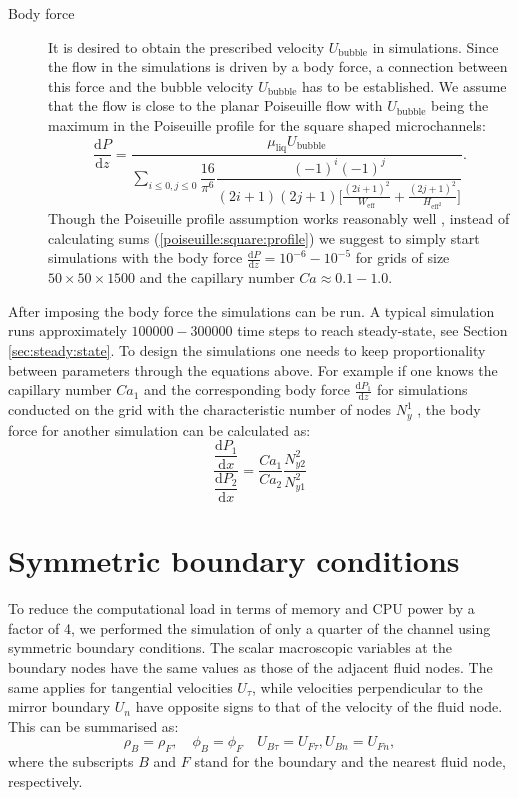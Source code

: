 \documentclass{article}
\begin{document}
\begin{description}
\item[Body force] 
It is desired to obtain the prescribed velocity $U_{\mathrm{bubble}}$ in simulations. Since the
flow in the simulations is driven by a body force, a connection between this force and the
bubble velocity $U_{\mathrm{bubble}}$ has to be established. We assume that the
flow is close to the planar Poiseuille flow with $U_{\mathrm{bubble}}$ being the maximum in the
Poiseuille profile for the square shaped microchannels:
\begin{equation}
\label{poiseuille:square:profile}
\dfrac{\mathrm{d}P}{\mathrm{d}z}=\frac{\mu_{\mathrm{liq}} U_{\mathrm{bubble}}}{\sum_{i\leq 0,j\leq
0}{\dfrac{16}{\pi^6} \dfrac{(-1)^i (-1)^j}{(2 i+1)(2 j+1)\bigl[\frac{(2 i
+1)^2}{W_{\mathrm{eff}}}+\frac{(2 j+1)^2}{H_{\mathrm{eff}^2}}\bigr]}}}.
\end{equation}
Though the Poiseuille profile assumption works reasonably well \cite{kuzmin-binary2d}, instead of
calculating sums (\ref{poiseuille:square:profile}) we suggest to simply start simulations with the
body force $\frac{\mathrm{d}P}{\mathrm{d}z}=10^{-6}-10^{-5}$ for grids of size $50\times 50 \times
1500$ and the capillary number $Ca\approx0.1-1.0$.  
\end{description}
After imposing the body force the simulations can be run. A typical simulation runs approximately
$100000-300000$ time steps to reach steady-state, see Section \ref{sec:steady:state}. To design the
simulations one needs to keep proportionality between parameters through the equations above. For
example if one knows the capillary number $Ca_1$ and the corresponding body force
$\frac{\mathrm{d}P_1}{\mathrm{d}z}$ for simulations conducted on the grid with the characteristic
number of nodes $N_y^1$ , the body force for another simulation can be calculated as:
\begin{equation}
\dfrac{\dfrac{\mathrm{d}P_1}{\mathrm{d}x}}{\dfrac{\mathrm{d}P_2}{\mathrm{d}x}}=\frac{Ca_1}{Ca_2}
\frac{N_{
y2}^2 }{N_{y1}^2}
\end{equation}

\section{Symmetric boundary conditions}
\label{append:sym}
To reduce the computational load in terms of memory and CPU power by a factor of 4, we performed the simulation of 
only a quarter of the channel using symmetric boundary conditions.  The scalar macroscopic variables
at the boundary nodes have the same values as those of the adjacent fluid nodes.  The same applies
for tangential velocities $U_{\tau}$, while velocities perpendicular  to the mirror boundary $U_n$ have opposite signs
to that of the velocity of the fluid node.  This can be summarised as:
\begin{equation}
\rho_B = \rho_F, \quad \phi_B = \phi_F \quad U_{B\tau}=U_{F\tau}, U_{B n}=U_{F n}, 
\end{equation}
where the subscripts $B$ and $F$ stand for the boundary and the nearest fluid node, respectively.
\end{document}
